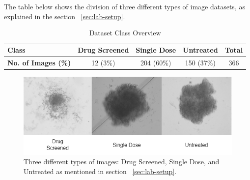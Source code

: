 The table below shows the division of three different types of image datasets, as  explained in the section ~\ref{sec:lab-setup}.
\begin{table}[ht!]
  \centering
  \begin{tabular}{|l|c|c|c|c|}
  \hline
  \textbf{Class} & \textbf{Drug Screened} & \textbf{Single Dose} & \textbf{Untreated} & \textbf{Total} \\ \hline
  \textbf{No. of Images (\%)}  & 12 (3\%) & 204 (60\%) & 150 (37\%) & 366 \\ \hline
  \end{tabular}
  \caption{Dataset Class Overview}
  \label{tab:dataset}
\end{table}

\begin{figure}[H]
  \centering
  \includegraphics[scale=0.6]{figures/originals.png} 
  \caption{Three different types of images: Drug Screened, Single Dose, and Untreated as mentioned in section ~\ref{sec:lab-setup}.}
  \label{fig:originals}
\end{figure}

